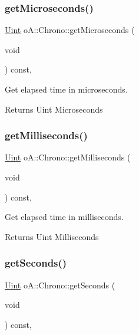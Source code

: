 \subsubsection{\texorpdfstring{get\+Microseconds()}{getMicroseconds()}}
{\footnotesize\ttfamily \mbox{\hyperlink{namespaceo_a_abe1d8250226c5cf34f84d7b75fc7922e}{Uint}} o\+A\+::\+Chrono\+::get\+Microseconds (\begin{DoxyParamCaption}\item[{void}]{ }\end{DoxyParamCaption}) const\hspace{0.3cm}{\ttfamily [inline]}, {\ttfamily [noexcept]}}



Get elapsed time in microseconds. 

\begin{DoxyReturn}{Returns}
Uint Microseconds 
\end{DoxyReturn}
\mbox{\label{classo_a_1_1_chrono_ad77117d4c523970030eda4cec93add7c}} 
\subsubsection{\texorpdfstring{get\+Milliseconds()}{getMilliseconds()}}
{\footnotesize\ttfamily \mbox{\hyperlink{namespaceo_a_abe1d8250226c5cf34f84d7b75fc7922e}{Uint}} o\+A\+::\+Chrono\+::get\+Milliseconds (\begin{DoxyParamCaption}\item[{void}]{ }\end{DoxyParamCaption}) const\hspace{0.3cm}{\ttfamily [inline]}, {\ttfamily [noexcept]}}



Get elapsed time in milliseconds. 

\begin{DoxyReturn}{Returns}
Uint Milliseconds 
\end{DoxyReturn}
\mbox{\label{classo_a_1_1_chrono_a41692d0d58ca6cfc3570d1b2169b4a96}} 
\subsubsection{\texorpdfstring{get\+Seconds()}{getSeconds()}}
{\footnotesize\ttfamily \mbox{\hyperlink{namespaceo_a_abe1d8250226c5cf34f84d7b75fc7922e}{Uint}} o\+A\+::\+Chrono\+::get\+Seconds (\begin{DoxyParamCaption}\item[{void}]{ }\end{DoxyParamCaption}) const\hspace{0.3cm}{\ttfamily [inline]}, {\ttfamily [noexcept]}}



